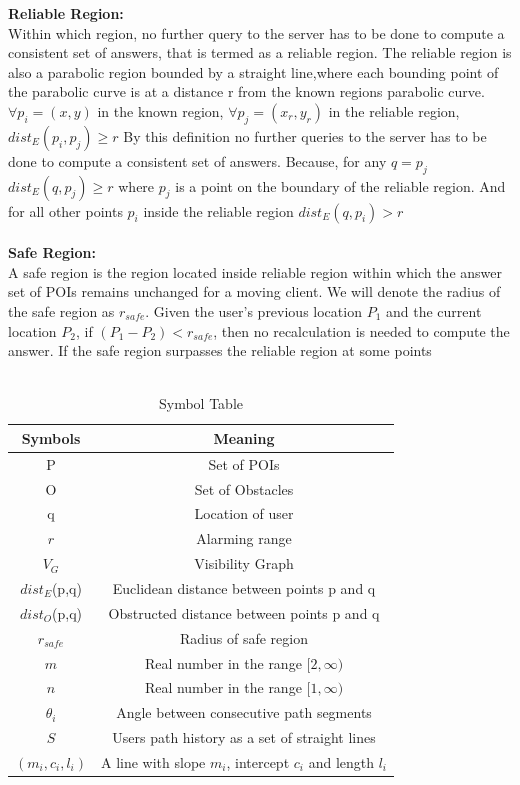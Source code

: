 \textbf{Reliable Region:} \\Within which region, no further query to the server has to be done to compute a consistent set of answers, that is termed as a reliable region. The reliable region is also a parabolic region bounded by a straight line,where each bounding point of the parabolic curve is at a distance r from the known regions parabolic curve. $ \forall p_i=(x,y) $ in the known region, $ \forall p_j=(x_r,y_r) $ in the reliable region, $ dist_E(p_i,p_j)\geq r $ By this definition no further queries to the server has to be done to compute a consistent set of answers. Because, for any $q =p_j$ $ dist_E(q,p_j) \geq r$ where $p_j$ is a point on the boundary of the reliable region. And for all other points $ p_i $ inside the reliable region $  dist_E(q,p_i)>r$ \\ \\


\textbf{Safe Region:}\\ A safe region is the region located inside reliable region within which the answer set of POIs remains unchanged for a moving client. We will denote the radius of the safe region as $r_{safe}$. Given the user's previous location $P_1$ and the current location $P_2$, if $(P_1 - P_2) < r_{safe}$, then no recalculation is needed to compute the answer. If the safe region surpasses the reliable region at some points 
\\ \\

\begin{table}[h]
\centering 

\caption{Symbol Table}
\begin{tabular}{|c|c|} \hline
Symbols&Meaning \\ \hline
P & Set of POIs\\ \hline
O & Set of Obstacles\\ \hline
q & Location of user\\ \hline
$r$ & Alarming range\\ \hline
$V_{G}$       & Visibility Graph\\ \hline
$dist_E$(p,q) & Euclidean distance between points p and q\\ \hline
$dist_O$(p,q) & Obstructed distance between points p and q\\ \hline
$r_{safe}$    & Radius of safe region\\ \hline
$m$           & Real number in the range $[2,\infty)$ \\ \hline
$n$           & Real number in the range $[1,\infty) $  \\ \hline
$\theta_i $   & Angle between consecutive path segments \\ \hline 
$ S $         & Users path history as a set of straight lines \\ \hline
$(m_i,c_i,l_i)$ & A line with slope $m_i$, intercept $c_i$ and length $l_i$ \\ \hline

\end{tabular}
\end{table}
\vspace*{12pt}

